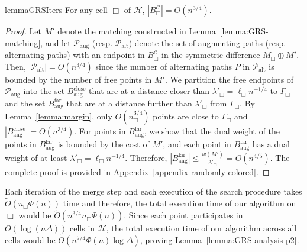 \documentclass[11pt,onecolumn]{article}
\def\mcC{{\mathcal{C}}}
\def\mcH{{\mathcal{H}}}
\def\mcP{{\mathcal{P}}}
\newcommand{\cell}{\Box}
\newcommand{\divider}[1]{\Gamma_{#1}}
\begin{document}
\begin{restatable}{lemma}{GRSIters}\label{lemma:GRS-cell-process}
    For any cell $\cell$ of $\mcH$, $|B_\cell^\mcC|=O(n^{3/4})$.
\end{restatable}
\begin{proof}
    Let $M'$ denote the matching constructed in Lemma~\ref{lemma:GRS-matching}, and let $\mcP_{\mathrm{aug}}$ (resp. $\mcP_{\mathrm{alt}}$) denote the set of augmenting paths (resp. alternating paths) with an endpoint in $B_\cell^\mcC$ in the symmetric difference $M_\cell\oplus M'$. Then, $|\mcP_{\mathrm{alt}}|=O(n^{3/4})$ since the number of alternating paths $P$ in $\mcP_{\mathrm{alt}}$ is bounded by the number of free points in $M'$. 
    We partition the free endpoints of $\mcP_{\mathrm{aug}}$ into the set $B^{\mathrm{close}}_{\mathrm{aug}}$ that are at a distance closer than $\lambda'_\cell=\ell_\cell n^{-1/4}$ to $\divider\cell$ and the set $B^{\mathrm{far}}_{\mathrm{aug}}$ that are at a distance further than $\lambda'_\cell$ from $\divider\cell$. By Lemma~\ref{lemma:margin}, only $O(n_\cell^{3/4})$ points are close to $\divider\cell$ and $|B^{\mathrm{close}}_{\mathrm{aug}}|=O(n^{3/4})$. 
    For points in $B^{\mathrm{far}}_{\mathrm{aug}}$, we show that the dual weight of the points in $B^{\mathrm{far}}_{\mathrm{aug}}$ is bounded by the cost of $M'$, and each point in $B^{\mathrm{far}}_{\mathrm{aug}}$ has a dual weight of at least $\lambda'_\cell = \ell_\cell n^{-1/4}$. Therefore, $|B^{\mathrm{far}}_{\mathrm{aug}}|\le \frac{w(M')}{\lambda'_\cell}= O(n^{4/5})$. The complete proof is provided in Appendix~\ref{appendix-randomly-colored}.
\end{proof}



Each iteration of the merge step and each execution of the search procedure takes $\tilde{O}(n_\cell\Phi(n))$ time and therefore, the total execution time of our algorithm on $\cell$ would be $\tilde{O}(n^{3/4}n_\cell\Phi(n))$. Since each point participates in $O(\log(n\Delta))$ cells in $\mcH$, the total execution time of our algorithm across all cells would be $\tilde{O}(n^{7/4}\Phi(n)\log\Delta)$, proving Lemma~\ref{lemma:GRS-analysis-p2}.



%
%
%


%
\end{document}
